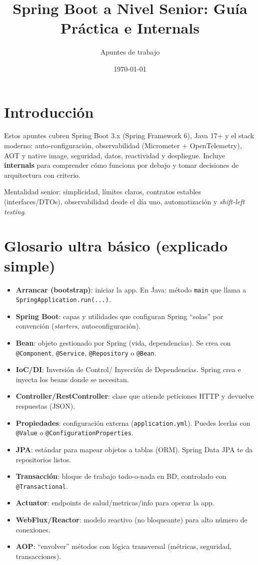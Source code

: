 \documentclass[11pt,a4paper]{article}
\title{Spring Boot a Nivel Senior: Guía Práctica e Internals}
\author{Apuntes de trabajo}
\date{\today}
\begin{document}
\maketitle
\tableofcontents
\newpage

\section{Introducción}
Estos apuntes cubren Spring Boot 3.x (Spring Framework 6), Java 17+ y el stack moderno: auto-configuración, observabilidad (Micrometer + OpenTelemetry), AOT y native image, seguridad, datos, reactividad y despliegue. Incluye \textbf{internals} para comprender cómo funciona por debajo y tomar decisiones de arquitectura con criterio.

\begin{tipbox}
Mentalidad senior: simplicidad, límites claros, contratos estables (interfaces/DTOs), observabilidad desde el día uno, automatización y \emph{shift-left testing}.
\end{tipbox}

\section{Glosario ultra básico (explicado simple)}
\begin{itemize}[leftmargin=*]
  \item \textbf{Arrancar (bootstrap)}: iniciar la app. En Java: método \texttt{main} que llama a \texttt{SpringApplication.run(...)}.
  \item \textbf{Spring Boot}: capas y utilidades que configuran Spring “solas” por convención (\emph{starters}, autoconfiguración).
  \item \textbf{Bean}: objeto gestionado por Spring (vida, dependencias). Se crea con \texttt{@Component}, \texttt{@Service}, \texttt{@Repository} o \texttt{@Bean}.
  \item \textbf{IoC/DI}: Inversión de Control/ Inyección de Dependencias. Spring crea e inyecta los beans donde se necesitan.
  \item \textbf{Controller/RestController}: clase que atiende peticiones HTTP y devuelve respuestas (JSON).
  \item \textbf{Propiedades}: configuración externa (\texttt{application.yml}). Puedes leerlas con \texttt{@Value} o \texttt{@ConfigurationProperties}.
  \item \textbf{JPA}: estándar para mapear objetos a tablas (ORM). Spring Data JPA te da repositorios listos.
  \item \textbf{Transacción}: bloque de trabajo todo-o-nada en BD, controlado con \texttt{@Transactional}.
  \item \textbf{Actuator}: endpoints de salud/metricas/info para operar la app.
  \item \textbf{WebFlux/Reactor}: modelo reactivo (no bloqueante) para alto número de conexiones.
  \item \textbf{AOP}: “envolver” métodos con lógica transversal (métricas, seguridad, transacciones).
\end{itemize}
\end{document}

